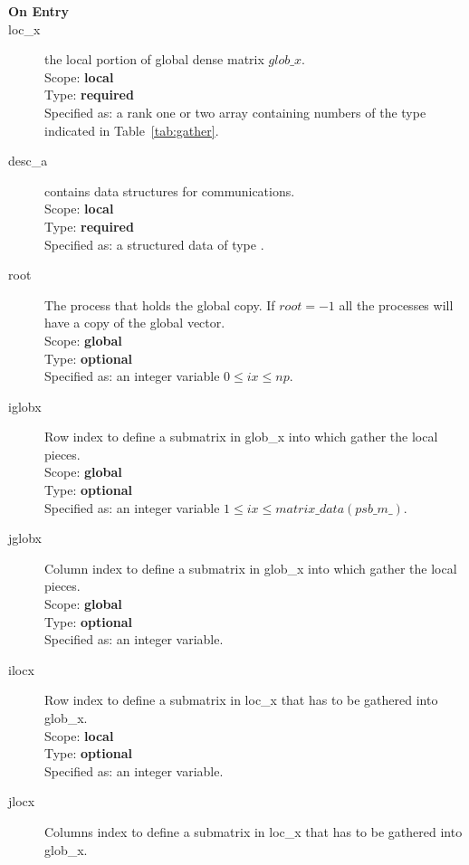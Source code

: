 
\begin{description}
\item[\bf On Entry]
\item[loc\_x] the local portion of global dense matrix
$glob\_x$. \\
Scope: {\bf local} \\
Type: {\bf required}\\
Specified as: a rank one or two array containing numbers of the type
indicated in Table~\ref{tab:gather}.
\item[desc\_a] contains data structures for communications.\\
Scope: {\bf local} \\
Type: {\bf required}\\
Specified as: a structured data of type \descdata.
\item[root]  The process that holds the global copy. If $root=-1$ all
  the processes will have a copy of the global vector.\\
Scope: {\bf global} \\
Type: {\bf optional}\\
Specified as: an integer variable $0\le ix\le np$. 
\item[iglobx]  Row index to define a submatrix in glob\_x into which
  gather the local pieces.\\
Scope: {\bf global} \\
Type: {\bf optional}\\
Specified as: an integer variable $1\le ix\le matrix\_data(psb\_m\_)$. 
\item[jglobx]  Column index to define a submatrix in glob\_x into which
  gather the local pieces.\\
Scope: {\bf global} \\
Type: {\bf optional}\\
Specified as: an integer variable. 
\item[ilocx]  Row index to define a submatrix in loc\_x that has to
  be gathered into glob\_x.\\
Scope: {\bf local} \\
Type: {\bf optional}\\
Specified as: an integer variable. 
\item[jlocx]  Columns index to define a submatrix in loc\_x that has
  to be gathered into glob\_x.\\

\end{description}
